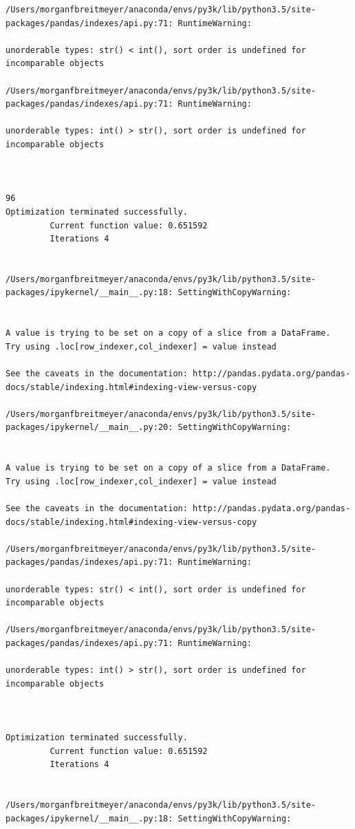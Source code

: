 \begin{lstlisting}
/Users/morganfbreitmeyer/anaconda/envs/py3k/lib/python3.5/site-packages/pandas/indexes/api.py:71: RuntimeWarning:

unorderable types: str() < int(), sort order is undefined for incomparable objects

/Users/morganfbreitmeyer/anaconda/envs/py3k/lib/python3.5/site-packages/pandas/indexes/api.py:71: RuntimeWarning:

unorderable types: int() > str(), sort order is undefined for incomparable objects



96
Optimization terminated successfully.
         Current function value: 0.651592
         Iterations 4


/Users/morganfbreitmeyer/anaconda/envs/py3k/lib/python3.5/site-packages/ipykernel/__main__.py:18: SettingWithCopyWarning:


A value is trying to be set on a copy of a slice from a DataFrame.
Try using .loc[row_indexer,col_indexer] = value instead

See the caveats in the documentation: http://pandas.pydata.org/pandas-docs/stable/indexing.html#indexing-view-versus-copy

/Users/morganfbreitmeyer/anaconda/envs/py3k/lib/python3.5/site-packages/ipykernel/__main__.py:20: SettingWithCopyWarning:


A value is trying to be set on a copy of a slice from a DataFrame.
Try using .loc[row_indexer,col_indexer] = value instead

See the caveats in the documentation: http://pandas.pydata.org/pandas-docs/stable/indexing.html#indexing-view-versus-copy

/Users/morganfbreitmeyer/anaconda/envs/py3k/lib/python3.5/site-packages/pandas/indexes/api.py:71: RuntimeWarning:

unorderable types: str() < int(), sort order is undefined for incomparable objects

/Users/morganfbreitmeyer/anaconda/envs/py3k/lib/python3.5/site-packages/pandas/indexes/api.py:71: RuntimeWarning:

unorderable types: int() > str(), sort order is undefined for incomparable objects



Optimization terminated successfully.
         Current function value: 0.651592
         Iterations 4


/Users/morganfbreitmeyer/anaconda/envs/py3k/lib/python3.5/site-packages/ipykernel/__main__.py:18: SettingWithCopyWarning:



\end{lstlisting}

